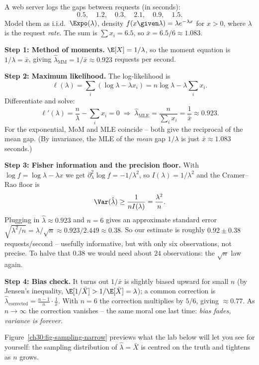 \begin{example}
\label{ch30:ex-full-expo}
A web server logs the gaps between requests (in seconds):
\[
  0.5,\quad 1.2,\quad 0.3,\quad 2.1,\quad 0.9,\quad 1.5.
\]
Model them as i.i.d.\ $\Expo(\lambda)$, density $f(x\given\lambda)=\lambda
e^{-\lambda x}$ for $x>0$, where $\lambda$ is the request \emph{rate}. The sum is
$\sum x_i = 6.5$, so $\bar x = 6.5/6 \approx 1.083$.

\textbf{Step 1: Method of moments.} $\E[X]=1/\lambda$, so the moment equation is
$1/\lambda=\bar x$, giving $\hat\lambda_{\mathrm{MM}}=1/\bar x \approx 0.923$
requests per second.

\textbf{Step 2: Maximum likelihood.} The log-likelihood is
\[
  \ell(\lambda) = \sum_i (\log\lambda - \lambda x_i)
                = n\log\lambda - \lambda\sum_i x_i.
\]
Differentiate and solve:
\[
  \ell'(\lambda) = \frac n\lambda - \sum_i x_i = 0
  \;\Longrightarrow\;
  \hat\lambda_{\mathrm{MLE}} = \frac{n}{\sum_i x_i} = \frac{1}{\bar x}
  \approx 0.923.
\]
For the exponential, MoM and MLE coincide -- both give the reciprocal of the
mean gap. (By invariance, the MLE of the \emph{mean} gap $1/\lambda$ is just
$\bar x\approx 1.083$ seconds.)

\textbf{Step 3: Fisher information and the precision floor.} With
$\log f = \log\lambda - \lambda x$ we get $\partial_\lambda^2\log f =
-1/\lambda^2$, so $I(\lambda)=1/\lambda^2$ and the Cramer--Rao floor is
\[
  \Var(\hat\lambda) \ge \frac{1}{nI(\lambda)} = \frac{\lambda^2}{n}.
\]
Plugging in $\hat\lambda\approx0.923$ and $n=6$ gives an approximate standard
error $\sqrt{\lambda^2/n}=\lambda/\sqrt n \approx 0.923/2.449 \approx 0.38$. So
our estimate is roughly $0.92 \pm 0.38$ requests/second -- usefully informative,
but with only six observations, not precise. To halve that $0.38$ we would need
about $24$ observations: the $\sqrt n$ law again.

\textbf{Step 4: Bias check.} It turns out $1/\bar x$ is slightly biased upward
for small $n$ (by Jensen's inequality, $\E[1/\bar X] > 1/\E[\bar X]=\lambda$); a
common correction is $\hat\lambda_{\text{corrected}}=\frac{n-1}{n}\cdot
\frac{1}{\bar x}$. With $n=6$ the correction multiplies by $5/6$, giving
$\approx 0.77$. As $n\to\infty$ the correction vanishes -- the same moral one
last time: \emph{bias fades, variance is forever}.
\end{example}

Figure~\ref{ch30:fig-sampling-narrow} previews what the lab below will let you
see for yourself: the sampling distribution of $\hat\lambda=\bar X$ is centred on
the truth and tightens as $n$ grows.

